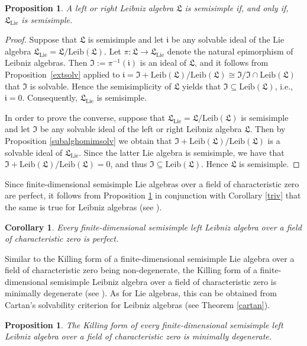\documentclass{amsart}
\newtheorem{pro}[thm]{Proposition}
\newtheorem{cor}[thm]{Corollary}
\numberwithin{equation}{section}
\newcommand{\lie}{\mathrm{Lie}}
\newcommand{\leib}{\mathrm{Leib}}
\newcommand{\lf}{\mathfrak{L}}
\newcommand{\If}{\mathfrak{I}}
\newcommand{\IIf}{\mathfrak{i}}
\begin{document}
\begin{pro}\label{semisim}
A left or right Leibniz algebra $\lf$ is semisimple if, and only if, $\mathfrak{L}_\mathrm{Lie}$
is semisimple.
\end{pro}

\begin{proof}
Suppose that $\lf$ is semisimple and let $\IIf$ be any solvable ideal of the Lie algebra $\lf_\lie
=\lf/\leib(\lf)$. Let $\pi:\lf\to\lf_\lie$ denote the natural epimorphism of Leibniz algebras. Then
$\If:=\pi^{-1}(\IIf)$ is an ideal of $\lf$, and it follows from Proposition~\ref{extsolv} applied
to $\IIf=\If+\leib(\lf)/\leib(\lf)\cong\If/\If\cap\leib(\lf)$ that $\If$ is solvable. Hence the
semisimplicity of $\lf$ yields that $\If\subseteq\leib(\lf)$, i.e., $\IIf=0$. Consequently,
$\lf_\lie$ is semisimple.

In order to prove the converse, suppose that $\lf_\lie=\lf/\leib(\lf)$ is semisimple and let
$\If$ be any solvable ideal of the left or right Leibniz algebra $\lf$. Then by Proposition
\ref{subalghomimsolv} we obtain that $\If+\leib(\lf)/\leib(\lf)$ is a solvable ideal of
$\lf_\lie$. Since the latter Lie algebra is semisimple, we have that $\If+\leib(\lf)/\leib(\lf)
=0$, and thus $\If\subseteq\leib(\lf)$. Hence $\lf$ is semisimple.
\end{proof}

Since finite-dimensional semisimple Lie algebras over a field of characteristic zero are perfect,
it follows from Proposition \ref{semisim} in conjunction with Corollary \ref{triv} that the same
is true for Leibniz algebras (see \cite[Corollary 5.5]{DMS1}).

\begin{cor}\label{semisimperfect}
Every finite-dimensional semisimple left Leibniz algebra over a field of characteristic zero is
perfect.
\end{cor}

Similar to the Killing form of a finite-dimensional semisimple Lie algebra over a field of characteristic
zero being non-degenerate, the Killing form of a finite-dimensional semisimple Leibniz algebra over
a field of characteristic zero is minimally degenerate (see \cite[Theorem 5.8]{DMS1}). As for Lie
algebras, this can be obtained from Cartan's solvability criterion for Leibniz algebras (see Theorem
\ref{cartan}).

\begin{pro}\label{mindeg}
The Killing form of every finite-dimensional semisimple left Leibniz algebra over a field of characteristic
zero is minimally degenerate.
\end{pro}
\end{document}
